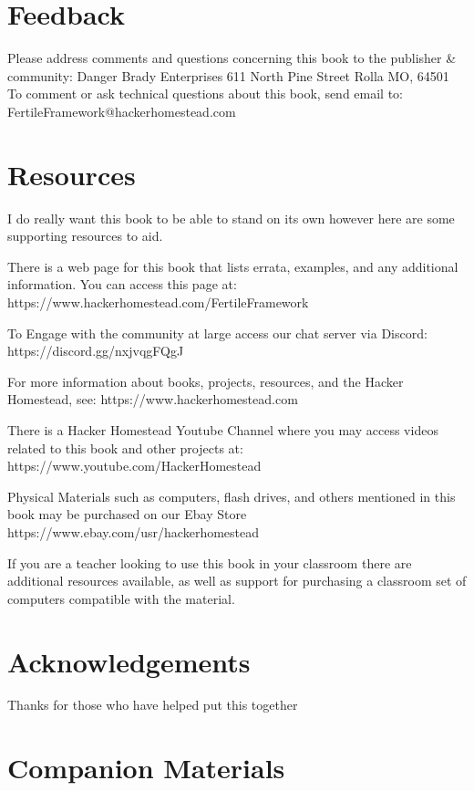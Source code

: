 \section{Feedback}

Please address comments and questions concerning this book to the publisher & community:
	Danger Brady Enterprises
	611 North Pine Street
	Rolla MO, 64501
To comment or ask technical questions about this book, send email to:
	FertileFramework@hackerhomestead.com

\section{Resources}

I do really want this book to be able to stand on its own however here are some supporting resources to aid.

There is a web page for this book that lists errata, examples, and any additional information. You can access this page at:
	https://www.hackerhomestead.com/FertileFramework

To Engage with the community at large access our chat server via Discord:
	https://discord.gg/nxjvqgFQgJ

For more information about books, projects, resources, and the Hacker Homestead, see:
	https://www.hackerhomestead.com

There is a Hacker Homestead Youtube Channel where you may access videos related to this book and other projects at:
	https://www.youtube.com/HackerHomestead

Physical Materials such as computers, flash drives, and others mentioned in this book may be purchased on our Ebay Store
https://www.ebay.com/usr/hackerhomestead

If you are a teacher looking to use this book in your classroom there are additional resources available, as well as support for purchasing a classroom set of computers compatible with the material.

\section{Acknowledgements}

Thanks for those who have helped put this together

\section{Companion Materials}

